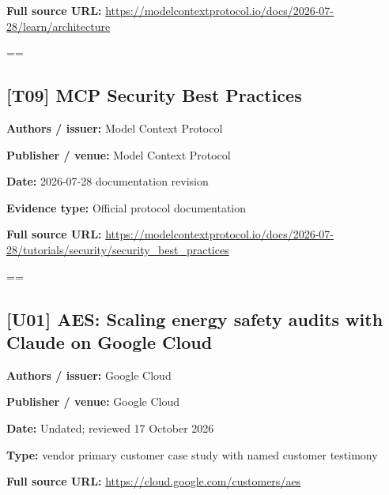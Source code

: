 \documentclass[10pt,letterpaper]{article}
\begin{document}
\textbf{Full source URL:} \href{https://modelcontextprotocol.io/docs/2026-07-28/learn/architecture}{\small\ttfamily https:/\allowbreak{}/\allowbreak{}modelcontextprotocol.\allowbreak{}io/\allowbreak{}docs/\allowbreak{}2026-\allowbreak{}07-\allowbreak{}28/\allowbreak{}learn/\allowbreak{}architecture}\par
\egroup\par\noindent\box\readingEntry\par\medskip
\setbox\readingEntry=\vbox\bgroup\hsize=\linewidth\subsection*{[T09] MCP Security Best Practices}
\textbf{Authors / issuer:} Model Context Protocol\par
\textbf{Publisher / venue:} Model Context Protocol\par
\textbf{Date:} 2026-07-28 documentation revision\par
\textbf{Evidence type:} Official protocol documentation\par
\textbf{Full source URL:} \href{https://modelcontextprotocol.io/docs/2026-07-28/tutorials/security/security_best_practices}{\small\ttfamily https:/\allowbreak{}/\allowbreak{}modelcontextprotocol.\allowbreak{}io/\allowbreak{}docs/\allowbreak{}2026-\allowbreak{}07-\allowbreak{}28/\allowbreak{}tutorials/\allowbreak{}security/\allowbreak{}security\_\allowbreak{}best\_\allowbreak{}practices}\par
\egroup\par\noindent\box\readingEntry\par\medskip
\setbox\readingEntry=\vbox\bgroup\hsize=\linewidth\subsection*{[U01] AES: Scaling energy safety audits with Claude on Google Cloud}
\textbf{Authors / issuer:} Google Cloud\par
\textbf{Publisher / venue:} Google Cloud\par
\textbf{Date:} Undated; reviewed 17 October 2026\par
\textbf{Type:} vendor primary customer case study with named customer testimony\par
\textbf{Full source URL:} \href{https://cloud.google.com/customers/aes}{\small\ttfamily https:/\allowbreak{}/\allowbreak{}cloud.\allowbreak{}google.\allowbreak{}com/\allowbreak{}customers/\allowbreak{}aes}\par
\end{document}

